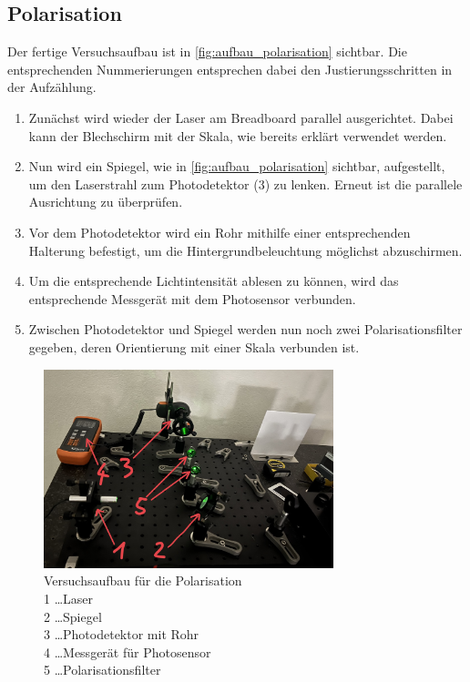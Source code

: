 \documentclass[12pt,english,ngerman]{scrartcl}
\begin{document}
\subsection{Polarisation}

Der fertige Versuchsaufbau ist in \autoref{fig:aufbau_polarisation} sichtbar. Die entsprechenden Nummerierungen entsprechen dabei den 
Justierungsschritten in der Aufzählung.

\begin{enumerate}
    \item Zunächst wird wieder der Laser am Breadboard parallel ausgerichtet. Dabei kann der Blechschirm mit der Skala, 
    wie bereits erklärt verwendet werden.
    \item Nun wird ein Spiegel, wie in \autoref{fig:aufbau_polarisation} sichtbar, aufgestellt, um den Laserstrahl 
    zum Photodetektor (3) zu lenken. Erneut ist die parallele Ausrichtung zu überprüfen.
    \item Vor dem Photodetektor wird ein Rohr mithilfe einer entsprechenden Halterung befestigt, um die Hintergrundbeleuchtung
    möglichst abzuschirmen.
    \item Um die entsprechende Lichtintensität ablesen zu können, wird das entsprechende Messgerät mit dem Photosensor verbunden.
    \item Zwischen Photodetektor und Spiegel werden nun noch zwei Polarisationsfilter gegeben, deren Orientierung mit 
    einer Skala verbunden ist.
\end{enumerate}

\begin{figure}[H]
	\begin{center}
		\includegraphics[width =0.75\textwidth]{./figures/aufbau_polarisation.jpg}
	\end{center}
	\caption[Versuchsaufbau für die Polarisation] {
		Versuchsaufbau für die Polarisation       \\
		1 \dots Laser                                    \\
		2 \dots Spiegel                                                      \\
		3 \dots Photodetektor mit Rohr                         \\
		4 \dots Messgerät für Photosensor \\
		5 \dots Polarisationsfilter   
	}\label{fig:aufbau_polarisation}
\end{figure}
\end{document}
